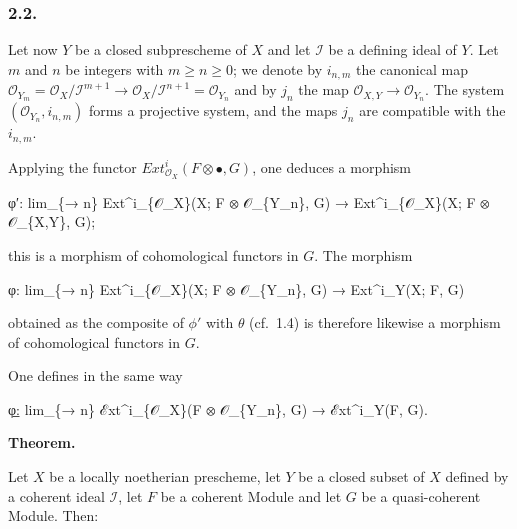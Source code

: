 \documentclass[
]{article}
\newenvironment{Shaded}{}{}
\newcommand{\NormalTok}[1]{#1}
\begin{document}
\subsubsection{2.2.}\label{section-4}

Let now \(Y\) be a closed subprescheme of \(X\) and let \(\mathcal{I}\)
be a defining ideal of \(Y\). Let \(m\) and \(n\) be integers with
\(m \geqslant n \geqslant 0\); we denote by \(i_{n,m}\) the canonical
map
\(\mathcal{O}_{Y_{m}} = \mathcal{O}_{X}/\mathcal{I}^{m+1} \to \mathcal{O}_{X}/\mathcal{I}^{n+1} = \mathcal{O}_{Y_{n}}\)
and by \(j_{n}\) the map \(\mathcal{O}_{X,Y} \to \mathcal{O}_{Y_{n}}\).
The system \((\mathcal{O}_{Y_{n}}, i_{n,m})\) forms a projective system,
and the maps \(j_{n}\) are compatible with the \(i_{n,m}\).

Applying the functor
\(Ext^{i}_{\mathcal{O}_{X}}(F \otimes \bullet, G)\), one deduces a
morphism

\begin{Shaded}
\begin{Highlighting}[]
\NormalTok{φ′: lim\_\{→ n\} Ext\^{}i\_\{𝒪\_X\}(X; F ⊗ 𝒪\_\{Y\_n\}, G) → Ext\^{}i\_\{𝒪\_X\}(X; F ⊗ 𝒪\_\{X,Y\}, G);}
\end{Highlighting}
\end{Shaded}

this is a morphism of cohomological functors in \(G\). The morphism

\begin{Shaded}
\begin{Highlighting}[]
\NormalTok{φ: lim\_\{→ n\} Ext\^{}i\_\{𝒪\_X\}(X; F ⊗ 𝒪\_\{Y\_n\}, G) → Ext\^{}i\_Y(X; F, G)}
\end{Highlighting}
\end{Shaded}

obtained as the composite of \(\phi'\) with \(\theta\) (cf.~1.4) is
therefore likewise a morphism of cohomological functors in \(G\).

One defines in the same way

\begin{Shaded}
\begin{Highlighting}[]
\NormalTok{φ̲: lim\_\{→ n\} ℰxt\^{}i\_\{𝒪\_X\}(F ⊗ 𝒪\_\{Y\_n\}, G) → ℰxt\^{}i\_Y(F, G).}
\end{Highlighting}
\end{Shaded}

\textbf{Theorem.}

Let \(X\) be a locally noetherian prescheme, let \(Y\) be a closed
subset of \(X\) defined by a coherent ideal \(\mathcal{I}\), let \(F\)
be a coherent Module and let \(G\) be a quasi-coherent Module. Then:
\end{document}
